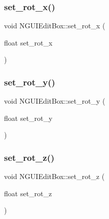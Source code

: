 \subsubsection{\texorpdfstring{set\+\_\+rot\+\_\+x()}{set\_rot\_x()}}
{\footnotesize\ttfamily void N\+G\+U\+I\+Edit\+Box\+::set\+\_\+rot\+\_\+x (\begin{DoxyParamCaption}\item[{float}]{set\+\_\+rot\+\_\+x }\end{DoxyParamCaption})}

\hypertarget{class_n_g_u_i_edit_box_a536c84b05c38d53aafc234f7074f43ff}{}\label{class_n_g_u_i_edit_box_a536c84b05c38d53aafc234f7074f43ff} 
\subsubsection{\texorpdfstring{set\+\_\+rot\+\_\+y()}{set\_rot\_y()}}
{\footnotesize\ttfamily void N\+G\+U\+I\+Edit\+Box\+::set\+\_\+rot\+\_\+y (\begin{DoxyParamCaption}\item[{float}]{set\+\_\+rot\+\_\+y }\end{DoxyParamCaption})}

\hypertarget{class_n_g_u_i_edit_box_a2aebb0704f23d68db769838938515628}{}\label{class_n_g_u_i_edit_box_a2aebb0704f23d68db769838938515628} 
\subsubsection{\texorpdfstring{set\+\_\+rot\+\_\+z()}{set\_rot\_z()}}
{\footnotesize\ttfamily void N\+G\+U\+I\+Edit\+Box\+::set\+\_\+rot\+\_\+z (\begin{DoxyParamCaption}\item[{float}]{set\+\_\+rot\+\_\+z }\end{DoxyParamCaption})}

\hypertarget{class_n_g_u_i_edit_box_a46e4ff5a7eb6d2629e92945d2e8d7643}{}\label{class_n_g_u_i_edit_box_a46e4ff5a7eb6d2629e92945d2e8d7643} 
